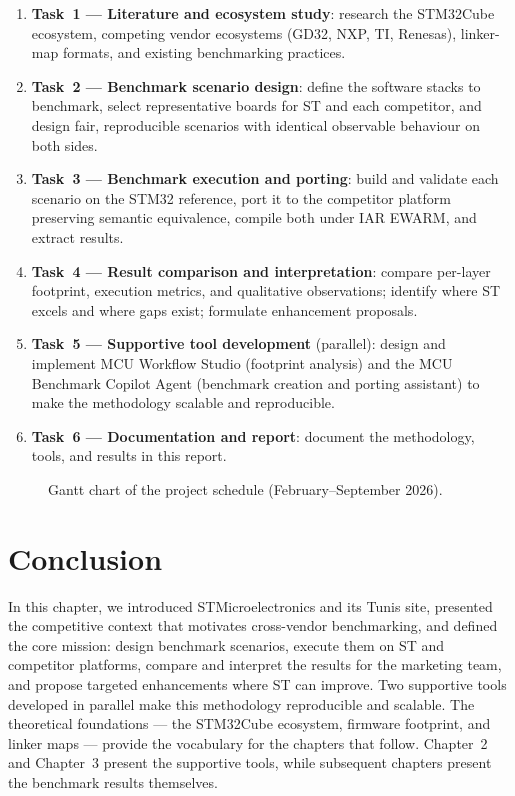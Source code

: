 \begin{enumerate}
\item \textbf{Task~1 --- Literature and ecosystem study}: research the STM32Cube
ecosystem, competing vendor ecosystems (GD32, NXP, TI, Renesas), linker-map formats,
and existing benchmarking practices.
\item \textbf{Task~2 --- Benchmark scenario design}: define the software stacks to
benchmark, select representative boards for ST and each competitor, and design fair,
reproducible scenarios with identical observable behaviour on both sides.
\item \textbf{Task~3 --- Benchmark execution and porting}: build and validate each
scenario on the STM32 reference, port it to the competitor platform preserving semantic
equivalence, compile both under IAR EWARM, and extract results.
\item \textbf{Task~4 --- Result comparison and interpretation}: compare per-layer
footprint, execution metrics, and qualitative observations; identify where ST excels and
where gaps exist; formulate enhancement proposals.
\item \textbf{Task~5 --- Supportive tool development} (parallel): design and implement
MCU Workflow Studio (footprint analysis) and the MCU Benchmark Copilot Agent (benchmark
creation and porting assistant) to make the methodology scalable and reproducible.
\item \textbf{Task~6 --- Documentation and report}: document the methodology, tools, and
results in this report.
\end{enumerate}

\begin{figure}[H]
\centering
{}
\caption{Gantt chart of the project schedule (February--September 2026).}
\label{fig:gantt}
\end{figure}

\section*{Conclusion}

In this chapter, we introduced STMicroelectronics and its Tunis site, presented the
competitive context that motivates cross-vendor benchmarking, and defined the core mission:
design benchmark scenarios, execute them on ST and competitor platforms, compare and
interpret the results for the marketing team, and propose targeted enhancements where ST can
improve. Two supportive tools developed in parallel make this methodology reproducible and
scalable. The theoretical foundations --- the STM32Cube ecosystem, firmware footprint, and
linker maps --- provide the vocabulary for the chapters that follow. Chapter~2 and
Chapter~3 present the supportive tools, while subsequent chapters present the benchmark
results themselves.
